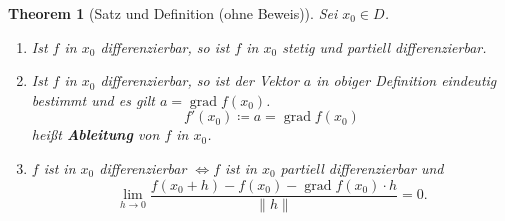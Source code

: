 \documentclass[12pt]{extreport} %
\theoremstyle{named}
\newtheorem{unnamedtheorem}{Theorem} \counterwithin{unnamedtheorem}{chapter}
\theoremstyle{nnamed}
\theoremstyle{itshape}
\theoremstyle{normal}
\begin{document}
\begin{unnamedtheorem}[Satz und Definition (ohne Beweis)] \label{18.2:satz}
	Sei $x_{0} \in D$. 
	\begin{enumerate}
		\item Ist $f$ in $x_{0}$ differenzierbar, so ist $f$ in $x_{0}$ stetig und partiell differenzierbar.
		\item Ist $f$ in $x_{0}$ differenzierbar, so ist der Vektor $a$ in obiger Definition eindeutig bestimmt und es gilt $a = \operatorname{grad} f(x_{0})$.
			$$ f'(x_{0}) \coloneqq a = \operatorname{grad} f(x_{0}) $$
			hei{\ss}t \textbf{Ableitung} von $f$ in $x_{0}$.
		\item $f$ ist in $x_{0}$ differenzierbar $\iff f$ ist in $x_{0}$ partiell differenzierbar und
			$$ \lim_{h \rightarrow 0} \frac{f(x_{0} + h) - f(x_{0}) - \operatorname{grad} f(x_{0}) \cdot h}{\| h \|} = 0. $$
	\end{enumerate}
\end{unnamedtheorem}
\end{document}
